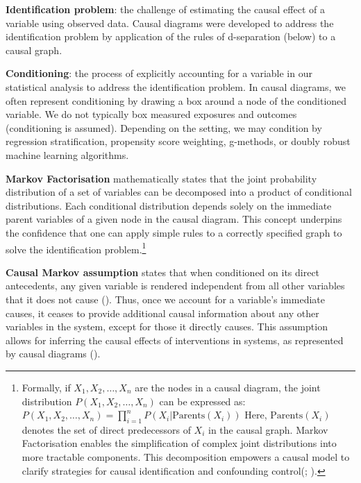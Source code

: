 \documentclass[
  singlecolumn,
  9pt]{article}
\begin{document}
\textbf{Identification problem}: the challenge of estimating the causal
effect of a variable using observed data. Causal diagrams were developed
to address the identification problem by application of the rules of
d-separation (below) to a causal graph.

\textbf{Conditioning}: the process of explicitly accounting for a
variable in our statistical analysis to address the identification
problem. In causal diagrams, we often represent conditioning by drawing
a box around a node of the conditioned variable. We do not typically box
measured exposures and outcomes (conditioning is assumed). Depending on
the setting, we may condition by regression stratification, propensity
score weighting, g-methods, or doubly robust machine learning
algorithms.

\textbf{Markov Factorisation} mathematically states that the joint
probability distribution of a set of variables can be decomposed into a
product of conditional distributions. Each conditional distribution
depends solely on the immediate parent variables of a given node in the
causal diagram. This concept underpins the confidence that one can apply
simple rules to a correctly specified graph to solve the identification
problem.\footnote{Formally, if \(X_1, X_2, \ldots, X_n\) are the nodes
  in a causal diagram, the joint distribution
  \(P(X_1, X_2, \ldots, X_n)\) can be expressed as:
  \(P(X_1, X_2, \ldots, X_n) = \prod_{i=1}^{n} P(X_i | \text{Parents}(X_i))\)
  Here, \(\text{Parents}(X_i)\) denotes the set of direct predecessors
  of \(X_i\) in the causal graph. Markov Factorisation enables the
  simplification of complex joint distributions into more tractable
  components. This decomposition empowers a causal model to clarify
  strategies for causal identification and confounding
  control(;
  ).}

\textbf{Causal Markov assumption} states that when conditioned on its
direct antecedents, any given variable is rendered independent from all
other variables that it does not cause (). Thus, once we account for a variable's immediate
causes, it ceases to provide additional causal information about any
other variables in the system, except for those it directly causes. This
assumption allows for inferring the causal effects of interventions in
systems, as represented by causal diagrams
().
\end{document}
